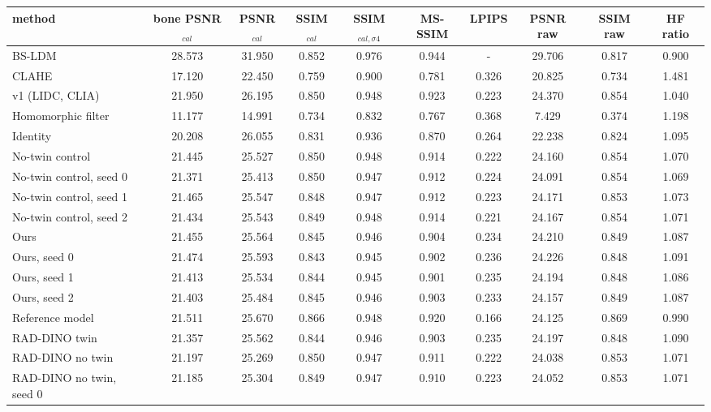 \begin{tabular}{lccccccccc}
\toprule
method & bone PSNR$_{cal}$ & PSNR$_{cal}$ & SSIM$_{cal}$ & SSIM$_{cal,\sigma4}$ & MS-SSIM & LPIPS & PSNR raw & SSIM raw & HF ratio \\
\midrule
BS-LDM & 28.573 & 31.950 & 0.852 & 0.976 & 0.944 & - & 29.706 & 0.817 & 0.900 \\
CLAHE & 17.120 & 22.450 & 0.759 & 0.900 & 0.781 & 0.326 & 20.825 & 0.734 & 1.481 \\
v1 (LIDC, CLIA) & 21.950 & 26.195 & 0.850 & 0.948 & 0.923 & 0.223 & 24.370 & 0.854 & 1.040 \\
Homomorphic filter & 11.177 & 14.991 & 0.734 & 0.832 & 0.767 & 0.368 & 7.429 & 0.374 & 1.198 \\
Identity & 20.208 & 26.055 & 0.831 & 0.936 & 0.870 & 0.264 & 22.238 & 0.824 & 1.095 \\
No-twin control & 21.445 & 25.527 & 0.850 & 0.948 & 0.914 & 0.222 & 24.160 & 0.854 & 1.070 \\
No-twin control, seed 0 & 21.371 & 25.413 & 0.850 & 0.947 & 0.912 & 0.224 & 24.091 & 0.854 & 1.069 \\
No-twin control, seed 1 & 21.465 & 25.547 & 0.848 & 0.947 & 0.912 & 0.223 & 24.171 & 0.853 & 1.073 \\
No-twin control, seed 2 & 21.434 & 25.543 & 0.849 & 0.948 & 0.914 & 0.221 & 24.167 & 0.854 & 1.071 \\
Ours & 21.455 & 25.564 & 0.845 & 0.946 & 0.904 & 0.234 & 24.210 & 0.849 & 1.087 \\
Ours, seed 0 & 21.474 & 25.593 & 0.843 & 0.945 & 0.902 & 0.236 & 24.226 & 0.848 & 1.091 \\
Ours, seed 1 & 21.413 & 25.534 & 0.844 & 0.945 & 0.901 & 0.235 & 24.194 & 0.848 & 1.086 \\
Ours, seed 2 & 21.403 & 25.484 & 0.845 & 0.946 & 0.903 & 0.233 & 24.157 & 0.849 & 1.087 \\
Reference model & 21.511 & 25.670 & 0.866 & 0.948 & 0.920 & 0.166 & 24.125 & 0.869 & 0.990 \\
RAD-DINO twin & 21.357 & 25.562 & 0.844 & 0.946 & 0.903 & 0.235 & 24.197 & 0.848 & 1.090 \\
RAD-DINO no twin & 21.197 & 25.269 & 0.850 & 0.947 & 0.911 & 0.222 & 24.038 & 0.853 & 1.071 \\
RAD-DINO no twin, seed 0 & 21.185 & 25.304 & 0.849 & 0.947 & 0.910 & 0.223 & 24.052 & 0.853 & 1.071 \\

\end{tabular}
